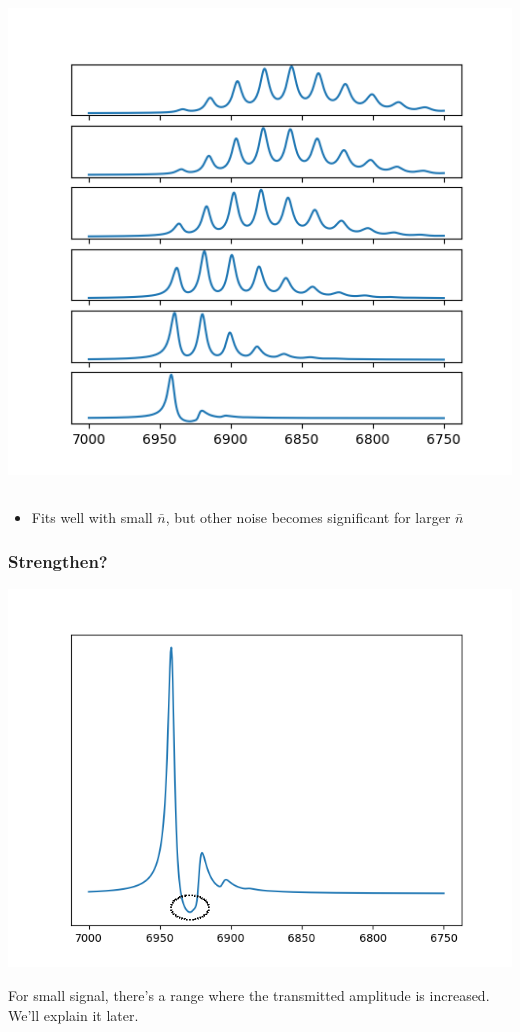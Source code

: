 \documentclass[xcolor=dvipsnames,hyperref={CJKbookmarks=true}]{beamer}
\begin{document}
\begin{frame}[t]
\begin{columns}
\begin{column}{0.65\linewidth}
    \includegraphics[width=\linewidth]{sweaping.png}
\end{column}
\end{columns}
\begin{itemize}
	\item Fits well with small $\bar n$, but other noise becomes significant 
	for larger $\bar n$
\end{itemize}
\end{frame}

\begin{frame}[t]\frametitle{Strengthen? }
\begin{center}
	\includegraphics[width=0.7\linewidth]{figure/erf=0.1.png}
\end{center}
For small signal, there's a range where the transmitted amplitude is increased. 
We'll explain it later. 
\end{frame}
\end{document}
